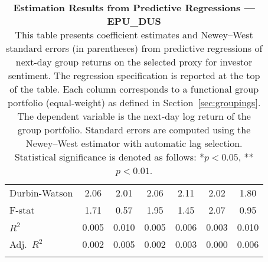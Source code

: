 \begin{table}[ht]
\begin{tabular}{l *{6}{c}}
Durbin-Watson & 2.06 & 2.01 & 2.06 & 2.11 & 2.02 & 1.80 \\
F-stat & 1.71 & 0.57 & 1.95 & 1.45 & 2.07 & 0.95 \\
\(R^2\) & 0.005 & 0.010 & 0.005 & 0.006 & 0.003 & 0.010 \\
Adj.\ \(R^2\) & 0.002 & 0.005 & 0.002 & 0.003 & 0.000 & 0.006 \\
\addlinespace
\midrule
\multicolumn{7}{c}{Specification tested: $R_{g,t+1} = \alpha_g + \beta_{sent,g} S_t + \phi R_{g,t} + \theta B_{g,t} + \gamma M_t + \varepsilon_{g,t+1}$}\\
\bottomrule
\end{tabular}
\caption{\textbf{Estimation Results from Predictive Regressions — EPU_DUS} \\
This table presents coefficient estimates and Newey--West standard errors (in parentheses) from predictive regressions of next-day group returns on the selected proxy for investor sentiment.
The regression specification is reported at the top of the table. Each column corresponds to a functional group portfolio (equal-weight) as defined in Section~\ref{sec:groupings}.
The dependent variable is the next-day log return of the group portfolio. Standard errors are computed using the Newey--West estimator with automatic lag selection. Statistical significance is denoted as follows: *$p<0.05$, **$p<0.01$.}
\label{tab:h2_epu_dus_results}
\end{table}